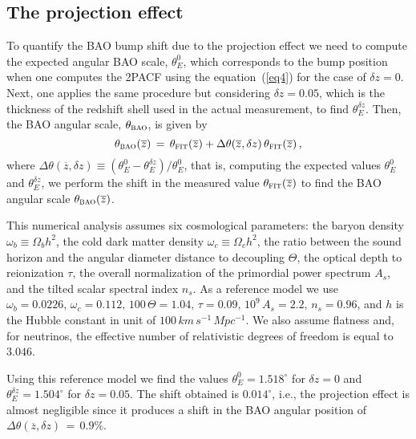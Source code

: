 \documentclass[a4paper,11pt]{article}
\begin{document}
\subsection{The projection effect}\label{IVc}

\noindent
To quantify the BAO bump shift due to the projection effect we need to compute the expected 
angular BAO scale, $\theta_{E}^{0}$, which corresponds to the bump position when one computes 
the 2PACF using the equation~(\ref{eq4}) for the case of $\delta z=0$. 
Next, one applies the same procedure but considering $\delta z = 0.05$, which is the thickness of the 
redshift shell used in the actual measurement, to find $\theta_{E}^{\delta z}$. 
Then, the BAO angular scale, $\theta_{\mbox{\footnotesize\sc bao}}$, is given by 
\begin{equation}
\theta_{\mbox{\footnotesize\sc bao}}(\overline{z}) \,=\, \theta_{\mbox{\footnotesize\sc fit}}(\overline{z}) 
+ \Delta \theta(\overline{z}, \delta z) \, \theta_{\mbox{\footnotesize\sc fit}}(\overline{z}) \, , 
\end{equation}
where $\Delta \theta(\overline{z}, \delta z) \equiv (\theta_{E}^{0} - \theta_{E}^{\delta z})/\theta_{E}^{0}$, 
that is, computing the expected values $\theta_{E}^{0}$ and $\theta_{E}^{\delta z}$, we 
perform the shift in the measured value $\theta_{\mbox{\footnotesize\sc fit}}(\overline{z})$ to find 
the BAO angular scale $\theta_{\mbox{\footnotesize\sc bao}}(\overline{z})$. 

This numerical analysis assumes six cosmological parameters: the baryon density 
$\omega_b \equiv \Omega_b h^2$, the cold dark matter density $\omega_c \equiv \Omega_c h^2$, 
the ratio between the sound horizon and the angular diameter distance to decoupling $\Theta$, the 
optical depth to reionization $\tau$, the overall normalization of the primordial power spectrum 
$A_s$, and the tilted scalar spectral index $n_s$. 
As a reference model we use 
$\omega_b = 0.0226,\, \omega_c = 0.112,\, 100\, \Theta=1.04,\, \tau=0.09,\, 10^{9}\,A_s = 2.2,\, 
n_s = 0.96$, and $h$ is the Hubble constant in unit of $ 100\, km\,s^{-1}\,Mpc^{-1}$. 
We also assume flatness and, for neutrinos, the effective number of relativistic degrees of freedom 
is equal to $3.046$. 
 

Using this reference model we find the values $\theta_{E}^0=1.518^\circ$ for $\delta z = 0$
and $\theta_{E}^{\delta z}=1.504^\circ$ for $\delta z = 0.05$. 
The shift obtained is $0.014^\circ$, i.e., the projection effect is almost negligible since it produces 
a shift in the BAO angular position of $\Delta \theta(\overline{z}, \delta z)\,=\,0.9\%$. 
\end{document}
